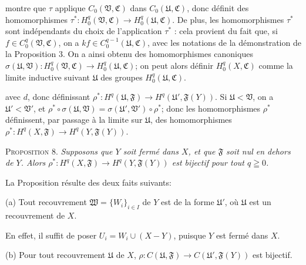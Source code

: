 montre que $\tau$ applique $C_0(\mathfrak{V}, \mathfrak{C})$ dans $C_0(\mathfrak{U}, \mathfrak{C})$, donc définit des homomorphismes $\tau^* : H_0^q(\mathfrak{V}, \mathfrak{C}) \to H_0^q(\mathfrak{U}, \mathfrak{C})$. De plus, les homomorphismes $\tau^*$ sont indépendants du choix de l'application $\tau^*$ : cela provient du fait que, si $f \in C_0^q(\mathfrak{V}, \mathfrak{C})$, on a $kf \in C_0^{q-1}(\mathfrak{U}, \mathfrak{C})$, avec les notations de la démonstration de la Proposition 3. On a ainsi obtenu des homomorphismes canoniques $\sigma(\mathfrak{U}, \mathfrak{V}) : H_0^q(\mathfrak{V}, \mathfrak{C}) \to H_0^q(\mathfrak{U}, \mathfrak{C})$; on peut alors définir $H_0^q(X, \mathfrak{C})$ comme la limite inductive suivant $\mathfrak{U}$ des groupes $H_0^q(\mathfrak{U}, \mathfrak{C})$.



 avec $d$, donc définissant $\rho^*:H^q(\mathfrak{U}, \mathfrak{F}) \to H^q(\mathfrak{U}', \mathfrak{F}(Y))$. Si $\mathfrak{U} < \mathfrak{V}$, on a $\mathfrak{U}' < \mathfrak{V}'$, et $\rho^* \circ \sigma(\mathfrak{U}, \mathfrak{V}) = \sigma(\mathfrak{U}', \mathfrak{V}') \circ \rho^*$; donc les homomorphismes $\rho^*$ définissent, par passage à la limite sur $\mathfrak{U}$, des homomorphismes $\rho^*:H^q(X, \mathfrak{F}) \to H^q(Y, \mathfrak{F}(Y))$.

\textsc{Proposition} 8. \textit{Supposons que $Y$ soit fermé dans $X$, et que $\mathfrak{F}$ soit nul en dehors de $Y$. Alors $\rho^*:H^q(X, \mathfrak{F}) \to H^q(Y, \mathfrak{F}(Y))$ est bijectif pour tout $q \geqq 0$.}

La Proposition résulte des deux faits suivants:

(a) Tout recouvrement $\mathfrak{W} = \{W_i\}_{i \in I}$ de $Y$ est de la forme $\mathfrak{U}'$, où $\mathfrak{U}$ est un recouvrement de $X$.

En effet, il suffit de poser $U_i = W_i \cup (X - Y)$, puisque $Y$ est fermé dans $X$.

(b) Pour tout recouvrement $\mathfrak{U}$ de $X$, $\rho:C(\mathfrak{U}, \mathfrak{F}) \to C(\mathfrak{U}', \mathfrak{F}(Y))$ est bijectif.

